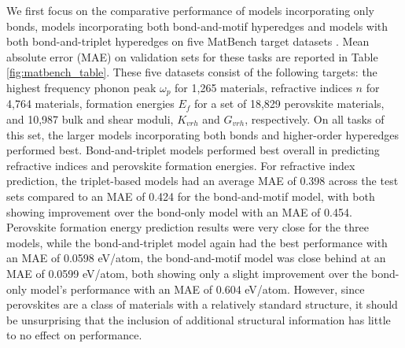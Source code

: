 \documentclass[10pt,a4paper,twocolumn]{article}
\begin{document}
We first focus on the comparative performance of models incorporating only bonds, models incorporating both bond-and-motif hyperedges and models with both bond-and-triplet hyperedges on five MatBench target datasets \cite{matbench}. Mean absolute error (MAE) on validation sets for these tasks are reported in Table \ref{fig:matbench_table}. These five datasets consist of the following targets: the highest frequency phonon peak $\omega_p$ for 1,265 materials, refractive indices $n$ for 4,764 materials, formation energies $E_f$ for a set of 18,829 perovskite materials, and 10,987 bulk and shear moduli, $K_{vrh}$ and $G_{vrh}$, respectively.
On all tasks of this set, the larger models incorporating both bonds and higher-order hyperedges performed best. 
Bond-and-triplet models performed best overall in predicting refractive indices and perovskite formation energies. For refractive index prediction, the triplet-based models had an average MAE of 0.398 across the test sets compared to an MAE of 0.424 for the bond-and-motif model, with both showing improvement over the bond-only model with an MAE of 0.454. Perovskite formation energy prediction results were very close for the three models, while the bond-and-triplet model again had the best performance with an MAE of 0.0598 eV/atom, the bond-and-motif model was close behind at an MAE of 0.0599 eV/atom, both showing only a slight improvement over the bond-only model's performance with an MAE of 0.604 eV/atom. However, since perovskites are a class of materials with a relatively standard structure, it should be unsurprising that the inclusion of additional structural information has little to no effect on performance.




\end{document}

